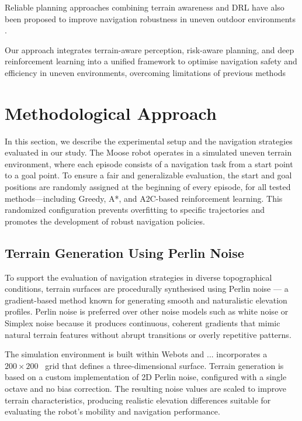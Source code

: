 \documentclass[conference]{IEEEtran}
\begin{document}
Reliable planning approaches combining terrain awareness and DRL have also been proposed to improve navigation robustness in uneven outdoor environments \cite{weerakoon2022terp}.

Our approach integrates terrain-aware perception, risk-aware planning, and deep reinforcement learning into a unified framework to optimise navigation safety and efficiency in uneven environments, overcoming limitations of previous methods

\section{Methodological Approach}

In this section, we describe the experimental setup and the navigation strategies evaluated in our study. The Moose robot operates in a simulated uneven terrain environment, where each episode consists of a navigation task from a start point to a goal point. To ensure a fair and generalizable evaluation, the start and goal positions are randomly assigned at the beginning of every episode, for all tested methods—including Greedy, A*, and A2C-based reinforcement learning. This randomized configuration prevents overfitting to specific trajectories and promotes the development of robust navigation policies.

\subsection{Terrain Generation Using Perlin Noise}

To support the evaluation of navigation strategies in diverse topographical conditions, terrain surfaces are procedurally synthesised using Perlin noise — a gradient-based method known for generating smooth and naturalistic elevation profiles. Perlin noise is preferred over other noise models such as white noise or Simplex noise because it produces continuous, coherent gradients that mimic natural terrain features without abrupt transitions or overly repetitive patterns.

The simulation environment is built within Webots and ... incorporates a \(200 \times 200\)~ grid that defines a three-dimensional surface. Terrain generation is based on a custom implementation of 2D Perlin noise, configured with a single octave and no bias correction. The resulting noise values are scaled to improve terrain characteristics, producing realistic elevation differences suitable for evaluating the robot's mobility and navigation performance.
\end{document}
